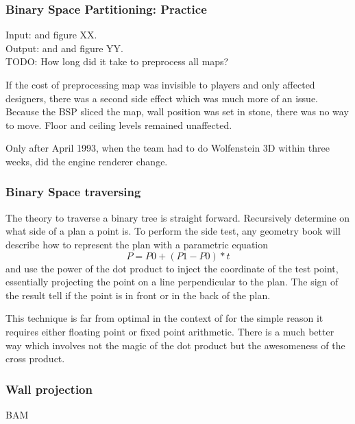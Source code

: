 \subsubsection{Binary Space Partitioning: Practice}
Input: and  figure XX.\\
Output: and  and  figure YY.\\
TODO: How long did it take to preprocess all maps?\\
\par
If the cost of preprocessing map was invisible to players and only affected designers, there was a second side effect which was much more of an issue. Because the BSP sliced the map, wall position was set in stone, there was no way to move. Floor and ceiling levels remained unaffected.\\
\par
Only after April 1993, when the team had to do Wolfenstein 3D within three weeks, did the engine renderer change.\\

\par

\subsubsection{Binary Space traversing}
The theory to traverse a binary tree is straight forward. Recursively determine on what side of a plan a point is. To perform the side test, any geometry book will describe how to represent the plan with a parametric equation $$ P = P0 + (P1 - P0) * t$$
and use the power of the dot product to inject the coordinate of the test point, essentially projecting the point on a line perpendicular to the plan. The sign of the result tell if the point is in front or in the back of the plan.\\
\par
This technique is far from optimal in the context of \doom for the simple reason it requires either floating point or fixed point arithmetic. There is a much better way which involves not the magic of the dot product but the awesomeness of the cross product.\\
\par
{}



\subsubsection{Wall projection}
BAM\\
\par
{}
\par
{}
\par
{}







